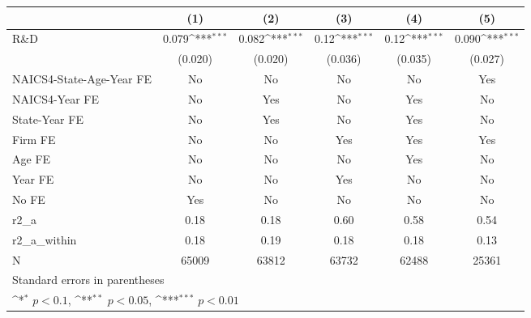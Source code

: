 {
\def\sym#1{\ifmmode^{#1}\else\(^{#1}\)\fi}
\begin{tabular}{l*{5}{c}}
\toprule
                    &\multicolumn{1}{c}{(1)}         &\multicolumn{1}{c}{(2)}         &\multicolumn{1}{c}{(3)}         &\multicolumn{1}{c}{(4)}         &\multicolumn{1}{c}{(5)}         \\
\midrule
R\&D                &       0.079\sym{***}&       0.082\sym{***}&        0.12\sym{***}&        0.12\sym{***}&       0.090\sym{***}\\
                    &     (0.020)         &     (0.020)         &     (0.036)         &     (0.035)         &     (0.027)         \\
\addlinespace
NAICS4-State-Age-Year FE&          No         &          No         &          No         &          No         &         Yes         \\
\addlinespace
NAICS4-Year FE      &          No         &         Yes         &          No         &         Yes         &          No         \\
\addlinespace
State-Year FE       &          No         &         Yes         &          No         &         Yes         &          No         \\
\addlinespace
Firm FE             &          No         &          No         &         Yes         &         Yes         &         Yes         \\
\addlinespace
Age FE              &          No         &          No         &          No         &         Yes         &          No         \\
\addlinespace
Year FE             &          No         &          No         &         Yes         &          No         &          No         \\
\addlinespace
No FE               &         Yes         &          No         &          No         &          No         &          No         \\
\midrule
r2\_a                &        0.18         &        0.18         &        0.60         &        0.58         &        0.54         \\
r2\_a\_within         &        0.18         &        0.19         &        0.18         &        0.18         &        0.13         \\
N                   &       65009         &       63812         &       63732         &       62488         &       25361         \\
\bottomrule
\multicolumn{6}{l}{\footnotesize Standard errors in parentheses}\\
\multicolumn{6}{l}{\footnotesize \sym{*} \(p<0.1\), \sym{**} \(p<0.05\), \sym{***} \(p<0.01\)}\\
\end{tabular}
}
